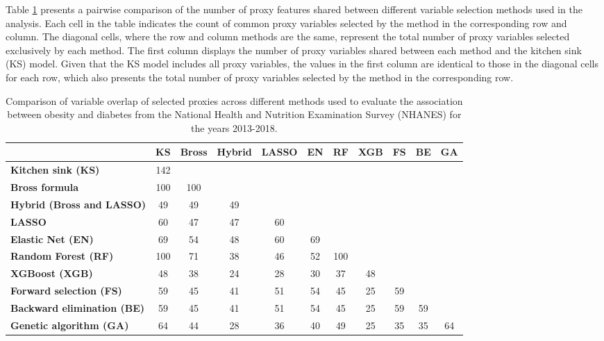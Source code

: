 \documentclass[sn-vancouver,Numbered,lineno,pdflatex]{sn-jnl}
\begin{document}
Table \ref{tab:method-comparison-updated} presents a pairwise comparison
of the number of proxy features shared between different variable
selection methods used in the analysis. Each cell in the table indicates
the count of common proxy variables selected by the method in the
corresponding row and column. The diagonal cells, where the row and
column methods are the same, represent the total number of proxy
variables selected exclusively by each method. The first column displays
the number of proxy variables shared between each method and the kitchen
sink (KS) model. Given that the KS model includes all proxy variables,
the values in the first column are identical to those in the diagonal
cells for each row, which also presents the total number of proxy
variables selected by the method in the corresponding row.

\begin{table}[htbp]
\centering
\caption{Comparison of variable overlap of selected proxies across different methods used to evaluate the association between obesity and diabetes from the National Health and Nutrition Examination Survey (NHANES) for the years 2013-2018.}
\label{tab:method-comparison-updated}
\begin{tabular}{lcccccccccc}
\toprule
 & \textbf{KS} & \textbf{Bross} & \textbf{Hybrid} & \textbf{LASSO} & \textbf{EN} & \textbf{RF} & \textbf{XGB} & \textbf{FS} & \textbf{BE} & \textbf{GA} \\
\midrule
\textbf{Kitchen sink (KS)} & 142 & & & & & & & & & \\
\textbf{Bross formula} & 100 & 100 & & & & & & & & \\
\textbf{Hybrid (Bross and LASSO)} & 49 & 49 & 49 & & & & & & & \\
\textbf{LASSO} & 60 & 47 & 47 & 60 & & & & & & \\
\textbf{Elastic Net (EN)} & 69 & 54 & 48 & 60 & 69 & & & & & \\
\textbf{Random Forest (RF)} & 100 & 71 & 38 & 46 & 52 & 100 & & & & \\  
\textbf{XGBoost (XGB)} & 48 & 38 & 24 & 28 & 30 & 37 & 48 & & & \\
\textbf{Forward selection (FS)} & 59 & 45 & 41 & 51 & 54 & 45 & 25 & 59 & & \\
\textbf{Backward elimination (BE)} & 59 & 45 & 41 & 51 & 54 & 45 & 25 & 59 & 59 & \\
\textbf{Genetic algorithm (GA)} & 64 & 44 & 28 & 36 & 40 & 49 & 25 & 35 & 35 & 64 \\
\bottomrule
\end{tabular}
\end{table}
\end{document}
